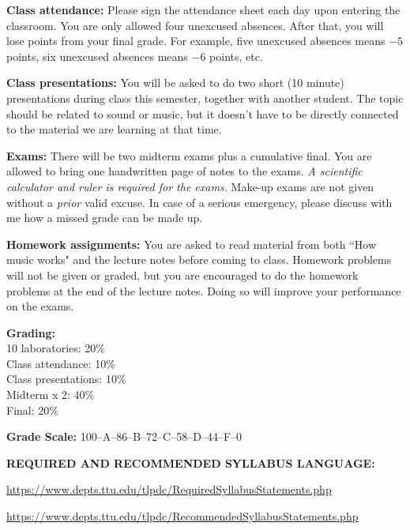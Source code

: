 \documentclass[11pt]{NSF}
\begin{document}
{\bf Class attendance:}
Please sign the attendance sheet each day upon entering 
the classroom.
You are only allowed four unexcused absences.
After that, you will lose points from your final grade.
For example, five unexcused absences means $-5$ points, six 
unexcused absences means $-6$ points, etc.
 
{\bf Class presentations:}
You will be asked to do two short (10 minute) presentations 
during class this semester, together with another student.
The topic should be related to sound or music, but it doesn't
have to be directly connected to the material we are learning
at that time.

{\bf Exams:}
There will be two midterm exams plus a cumulative final.
You are allowed to bring one handwritten page of notes to the exams.
{\em A scientific calculator and ruler is required for the exams.}
Make-up exams are not given without a {\em prior} valid excuse.
In case of a serious emergency, please discuss with me how a missed
grade can be made up.

{\bf Homework assignments:}
You are asked to read material from both ``How music works" and
the lecture notes before coming to class.
Homework problems will not be given or graded, but you are
encouraged to do the homework problems at the end of the lecture notes.
Doing so will improve your performance on the exams.

{\bf Grading:}\\
10 laboratories: 20\%\\
Class attendance: 10\%\\
Class presentations: 10\%\\
Midterm x 2: 40\%\\
Final: 20\%

{\bf Grade Scale:} 100--A--86--B--72--C--58--D--44--F--0
 
{\bf REQUIRED AND RECOMMENDED SYLLABUS LANGUAGE:}

\url{https://www.depts.ttu.edu/tlpdc/RequiredSyllabusStatements.php}

\url{https://www.depts.ttu.edu/tlpdc/RecommendedSyllabusStatements.php}
\end{document}
